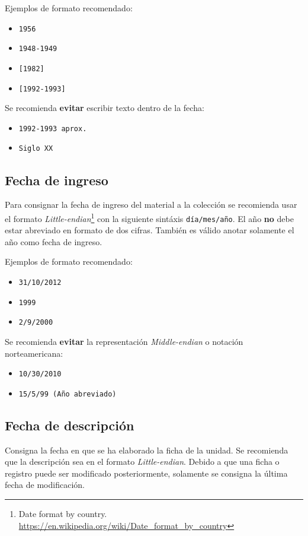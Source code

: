 \documentclass[10pt,letterpaper]{article}
\begin{document}
Ejemplos de formato recomendado:
{\color{Blue}
\begin{itemize}
	\item \texttt{1956}
	\item \texttt{1948-1949}
	\item \texttt{[1982]}
	\item \texttt{[1992-1993]}
\end{itemize}
}

Se recomienda \textbf{evitar} escribir texto dentro de la fecha:
{\color{Red}
\begin{itemize}
	\item \texttt{1992-1993 aprox.}
	\item \texttt{Siglo XX}
\end{itemize}
}

\subsection{Fecha de ingreso}
Para consignar la fecha de ingreso del material a la colección se recomienda usar el formato \textit{Little-endian}\footnote{Date format by country. \url{https://en.wikipedia.org/wiki/Date_format_by_country}} con la siguiente sintáxis \verb|día/mes/año|. El año \textbf{no} debe estar abreviado en formato de dos cifras. También es válido anotar solamente el año como fecha de ingreso. 

Ejemplos de formato recomendado:
{\color{Blue}
\begin{itemize}
	\item \texttt{31/10/2012}
	\item \texttt{1999}
	\item \texttt{2/9/2000}
\end{itemize}
}

Se recomienda \textbf{evitar} la representación \textit{Middle-endian} o notación norteamericana:
{\color{Red}
\begin{itemize}
	\item \texttt{10/30/2010}
	\item \texttt{15/5/99 (Año abreviado)}
\end{itemize}
}

\subsection{Fecha de descripción}
Consigna la fecha en que se ha elaborado la ficha de la unidad. Se recomienda que la descripción sea en el formato \textit{Little-endian}. Debido a que una ficha o registro puede ser modificado posteriormente, solamente se consigna la última fecha de modificación.
\end{document}
